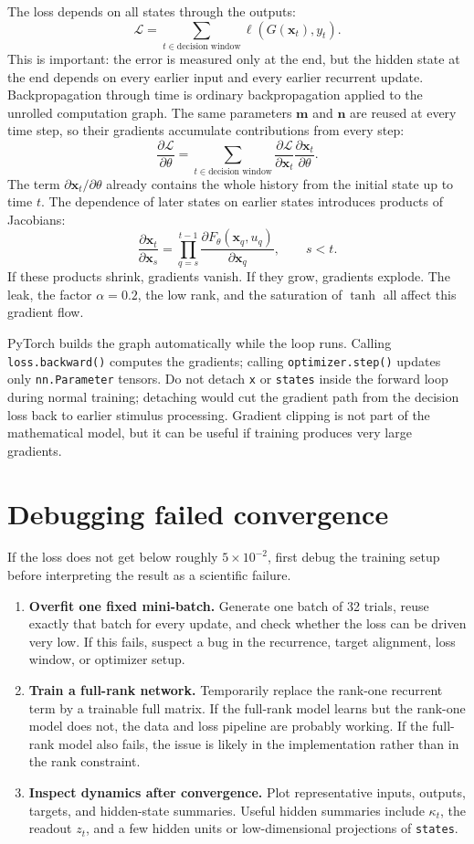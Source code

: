 \documentclass[11pt]{article}
\newcommand{\vx}{\mathbf{x}}
\newcommand{\vm}{\mathbf{m}}
\newcommand{\vn}{\mathbf{n}}
\begin{document}
The loss depends on all states through the outputs:
\[
  \mathcal{L}
  =
  \sum_{t \in \text{decision window}} \ell(G(\vx_t), y_t).
\]
This is important: the error is measured only at the end, but the hidden state at
the end depends on every earlier input and every earlier recurrent update.
Backpropagation through time is ordinary backpropagation applied to the unrolled
computation graph. The same parameters $\vm$ and $\vn$ are reused at every time
step, so their gradients accumulate contributions from every step:
\[
  \frac{\partial \mathcal{L}}{\partial \theta}
  =
  \sum_{t \in \text{decision window}}
  \frac{\partial \mathcal{L}}{\partial \vx_t}
  \frac{\partial \vx_t}{\partial \theta}.
\]
The term $\partial \vx_t / \partial \theta$ already contains the whole history
from the initial state up to time $t$. The dependence of later states on earlier
states introduces products of Jacobians:
\[
  \frac{\partial \vx_t}{\partial \vx_s}
  =
  \prod_{q=s}^{t-1}
  \frac{\partial F_\theta(\vx_q,u_q)}{\partial \vx_q},
  \qquad s < t.
\]
If these products shrink, gradients vanish. If they grow, gradients explode.
The leak, the factor $\alpha=0.2$, the low rank, and the saturation of $\tanh$
all affect this gradient flow.

PyTorch builds the graph automatically while the loop runs. Calling
\texttt{loss.backward()} computes the gradients; calling
\texttt{optimizer.step()} updates only \texttt{nn.Parameter} tensors.
Do not detach \texttt{x} or \texttt{states} inside the forward loop during normal
training; detaching would cut the gradient path from the decision loss back to
earlier stimulus processing. Gradient clipping is not part of the mathematical
model, but it can be useful if training produces very large gradients.

\section{Debugging failed convergence}

If the loss does not get below roughly $5 \times 10^{-2}$, first debug the
training setup before interpreting the result as a scientific failure.
\begin{enumerate}
  \item \textbf{Overfit one fixed mini-batch.} Generate one batch of 32 trials,
  reuse exactly that batch for every update, and check whether the loss can be
  driven very low. If this fails, suspect a bug in the recurrence, target
  alignment, loss window, or optimizer setup.
  \item \textbf{Train a full-rank network.} Temporarily replace the rank-one
  recurrent term by a trainable full matrix. If the full-rank model learns but
  the rank-one model does not, the data and loss pipeline are probably working.
  If the full-rank model also fails, the issue is likely in the implementation
  rather than in the rank constraint.
  \item \textbf{Inspect dynamics after convergence.} Plot representative inputs,
  outputs, targets, and hidden-state summaries. Useful hidden summaries include
  $\kappa_t$, the readout $z_t$, and a few hidden units or low-dimensional
  projections of \texttt{states}.
\end{enumerate}
\end{document}
